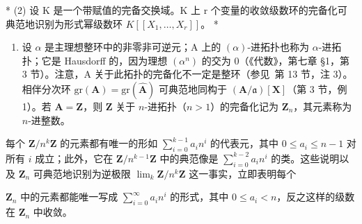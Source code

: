* (2) 设 K 是一个带赋值的完备交换域。K 上 r 个变量的收敛级数环的完备化可典范地识别为形式幂级数环 \(K[[X_{1},\ldots,X_{r}]]\)。 *

\begin{enumerate}
\def\labelenumi{(\arabic{enumi})}
\setcounter{enumi}{2}
\tightlist
\item
  设 \(\alpha\) 是主理想整环中的非零非可逆元；A 上的 \((\alpha)\)-进拓扑也称为 \(\alpha\)-进拓扑；它是 Hausdorff 的，因为理想 \((\alpha^n)\) 的交为 0（《代数》，第七章 §1，第 3 节）。注意，A 关于此拓扑的完备化不一定是整环（参见~第 13 节，注 3）。相伴分次环 \(\mathrm{gr}(\mathbf{A}) = \mathrm{gr}(\hat{\mathbf{A}})\) 可典范地同构于 \((\mathbf{A}/\mathfrak{a})[\mathbf{X}]\)（第 3 节，例 1）。若 \(\mathbf{A} = \mathbf{Z}\)，则 \(\mathbf{Z}\) 关于 \(n\)-进拓扑（\(n > 1\)）的完备化记为 \(\mathbf{Z}_n\)，其元素称为 \(n\)-进整数。
\end{enumerate}

每个 \(\mathbf{Z} / n^k\mathbf{Z}\) 的元素都有唯一的形如 \(\sum_{i=0}^{k-1} a_i n^i\) 的代表元，其中 \(0 \leqslant a_i \leqslant n - 1\) 对所有 \(i\) 成立；此外，它在 \(\mathbf{Z} / n^{k-1}\mathbf{Z}\) 中的典范像是 \(\sum_{i=0}^{k-2} a_i n^i\) 的类。这些说明以及 \(\mathbf{Z}_n\) 可典范地识别为逆极限 \(\lim_{k} \mathbf{Z}/n^k \mathbf{Z}\) 这一事实，立即表明每个

\(\mathbf{Z}_n\) 中的元素都能唯一写成 \(\sum_{i=0}^{\infty} a_i n^i\) 的形式，其中 \(0 \leqslant a_i < n\)，反之这样的级数在 \(\mathbf{Z}_n\) 中收敛。
